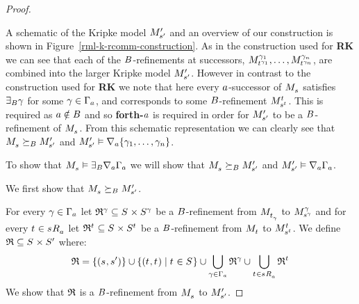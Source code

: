 \begin{proof}
\begin{figure}
\end{figure}

A schematic of the Kripke model $\kPModelP{\kStateSP}$ and an overview of our construction is shown in Figure~\ref{rml-k-rcomm-construction}.
As in the construction used for {\bf RK} we can see that each of the $\agentsB$-refinements at successors, $\kPModel[\gamma_1]{\kStateT[\gamma_1]}, \dots, \kPModel[\gamma_n]{\kStateT[\gamma_n]}$, are combined into the larger Kripke model $\kPModelP{\kStateSP}$.
However in contrast to the construction used for {\bf RK} we note that here every $\agentA$-successor of $\kPModel{\kStateS}$ satisfies $\somerefsBs \gamma$ for some $\gamma \in \Gamma_\agentA$, and corresponds to some $\agentsB$-refinement $\kPModel[\kStateT]{\kStateS[\kStateT]}$.
This is required as $\agentA \notin \agentsB$ and so {\bf forth-$\agentA$} is required in order for $\kPModelP{\kStateSP}$ to be a $\agentsB$-refinement of $\kPModel{\kStateS}$.
From this schematic representation we can clearly see that $\kPModel{\kStateS} \simulatesBs \kPModelP{\kStateSP}$ and $\kPModelP{\kStateSP} \entails \coversA \{\gamma_1, \dots, \gamma_n\}$.

To show that $\kPModel{\kStateS} \entails \somerefsBs \coversA \Gamma_\agentA$ we will show that $\kPModel{\kStateS} \simulatesBs \kPModelP{\kStateSP}$ and $\kPModelP{\kStateSP} \entails \coversA \Gamma_\agentA$.

We first show that $\kPModel{\kStateS} \simulatesBs \kPModelP{\kStateSP}$.

For every $\gamma \in \Gamma_\agentA$ let $\refinement^\gamma \subseteq \kStates \times \kStates[\gamma]$ be a $\agentsB$-refinement from $\kPModel{\kStateT_\gamma}$ to $\kPModel[\gamma]{\kStateS[\gamma]}$ and
for every $\kStateT \in \kSuccessorsA{\kStateS}$ let $\refinement^{\kStateT} \subseteq \kStates \times \kStates[\kStateT]$ be a $\agentsB$-refinement from $\kPModel{\kStateT}$ to $\kPModel[\kStateT]{\kStateS[\kStateT]}$.
We define $\refinement \subseteq \kStates \times \kStatesP$ where:
$$
\refinement = \{(\kStateS, \kStateSP)\} \cup \{(\kStateT, \kStateT) \mid \kStateT \in \kStates\} \cup \bigcup_{\gamma \in \Gamma_\agentA} \refinement^\gamma \cup \bigcup_{\kStateT \in \kSuccessorsA{\kStateS}} \refinement^{\kStateT}
$$
We show that $\refinement$ is a $\agentsB$-refinement from $\kPModel{\kStateS}$ to $\kPModelP{\kStateSP}$.


\end{proof}
